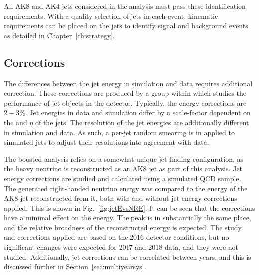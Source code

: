 All AK8 and AK4 jets considered in the analysis must pass these identification requirements. With a quality selection of jets in each event, kinematic requirements can be placed on the jets to identify signal and background events as detailed in Chapter~\ref{ch:strategy}.

\subsection{Corrections}
The differences between the jet energy in simulation and data requires additional correction. These corrections are produced by a group within \CMS which studies the performance of jet objects in the detector. Typically, the energy corrections are $2-3\%$.
Jet energies in data and simulation differ by a scale-factor dependent on the \pt and $\eta$ of the jets. The resolution of the jet energies are additionally different in simulation and data.  As such, a per-jet random smearing is in applied to simulated jets to adjust their resolutions into agreement with data. 

The boosted analysis relies on a somewhat unique jet finding configuration, as the heavy neutrino is reconstructed as an AK8 jet as part of this analysis. Jet energy corrections are studied and calculated using a simulated QCD sample.  The generated right-handed neutrino energy was compared to the energy of the AK8 jet reconstructed from it, both with and without jet energy corrections applied.  This is shown in Fig.~\ref{fig:jetEvsNRE}.  It can be seen that the corrections have a minimal effect on the energy.  The peak is in substantially the same place, and the relative broadness of the reconstructed energy is expected.  The study and corrections applied are based on the 2016 detector conditions, but no significant changes were expected for 2017 and 2018 data, and they were not studied. Additionally, jet corrections can be correlated between years, and this is discussed further in Section~\ref{sec:multiyearsys}.

